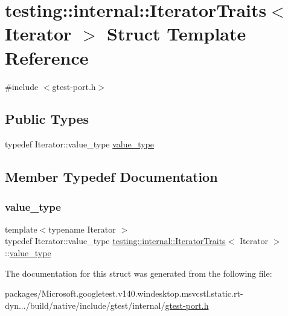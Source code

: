 \hypertarget{structtesting_1_1internal_1_1_iterator_traits}{}\section{testing\+::internal\+::Iterator\+Traits$<$ Iterator $>$ Struct Template Reference}
\label{structtesting_1_1internal_1_1_iterator_traits}


{\ttfamily \#include $<$gtest-\/port.\+h$>$}

\subsection*{Public Types}
\begin{DoxyCompactItemize}
\item 
typedef Iterator\+::value\+\_\+type \mbox{\hyperlink{structtesting_1_1internal_1_1_iterator_traits_a29de4320a9c53ce438d3561b94e515bb}{value\+\_\+type}}
\end{DoxyCompactItemize}


\subsection{Member Typedef Documentation}
\mbox{\label{structtesting_1_1internal_1_1_iterator_traits_a29de4320a9c53ce438d3561b94e515bb}} 
\subsubsection{\texorpdfstring{value\_type}{value\_type}}
{\footnotesize\ttfamily template$<$typename Iterator $>$ \\
typedef Iterator\+::value\+\_\+type \mbox{\hyperlink{structtesting_1_1internal_1_1_iterator_traits}{testing\+::internal\+::\+Iterator\+Traits}}$<$ Iterator $>$\+::\mbox{\hyperlink{structtesting_1_1internal_1_1_iterator_traits_a29de4320a9c53ce438d3561b94e515bb}{value\+\_\+type}}}



The documentation for this struct was generated from the following file\+:\begin{DoxyCompactItemize}
\item 
packages/\+Microsoft.\+googletest.\+v140.\+windesktop.\+msvcstl.\+static.\+rt-\/dyn.../build/native/include/gtest/internal/\mbox{\hyperlink{gtest-port_8h}{gtest-\/port.\+h}}\end{DoxyCompactItemize}
